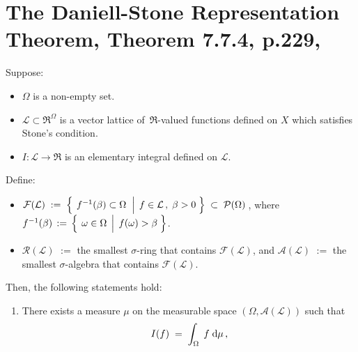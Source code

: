 

\section{The Daniell-Stone Representation Theorem, Theorem 7.7.4, p.229, \cite{Cohn2013}}
\setcounter{theorem}{0}
\setcounter{equation}{0}


\renewcommand{\theenumi}{\roman{enumi}}
\renewcommand{\labelenumi}{\textnormal{(\theenumi)}$\;\;$}


\begin{theorem}
\mbox{}\vskip 0.1cm
\noindent
Suppose:
\begin{itemize}
\item
	$\Omega$ is a non-empty set.
\item
	$\mathcal{L} \subset \Re^{\Omega}$ is a vector lattice of \,$\Re$-valued functions defined on $X$
	which satisfies Stone's condition.
\item
	$I : \mathcal{L} \longrightarrow \Re$ is an elementary integral defined on $\mathcal{L}$.
\end{itemize}
Define:
\begin{itemize}
\item
	$\mathcal{F}(\mathcal{L})
	\; := \;
		\left\{\;
		\left.
		f^{-1}(\beta) \overset{{\color{white}.}}{\subset} \Omega
		\;\;\right\vert\;
		f \in \mathcal{L}\,,\; \beta > 0
		\;\right\}
	\; \subset \;
		\mathcal{P}(\Omega)$\,,
	where
	\,$f^{-1}(\beta) \,:=\, \left\{\;\left.\omega\overset{{\color{white}.}}{\in}\Omega \,\;\right\vert\; f(\omega) > \beta \;\right\}$.
\item
	$\mathcal{R}(\mathcal{L})$ $:=$ the smallest $\sigma$-ring that contains $\mathcal{F}(\mathcal{L})$, and
	$\mathcal{A}(\mathcal{L})$ $:=$ the smallest $\sigma$-algebra that contains $\mathcal{F}(\mathcal{L})$.
\end{itemize}
Then, the following statements hold:
\begin{enumerate}
\item
	There exists a measure $\mu$ on the measurable space $(\Omega,\mathcal{A}(\mathcal{L}))$ such that
	\begin{equation*}
	I(f) \; = \; \int_{\Omega}\; f \;\d\mu\,,

\end{equation*}
\end{enumerate}
\end{theorem}

